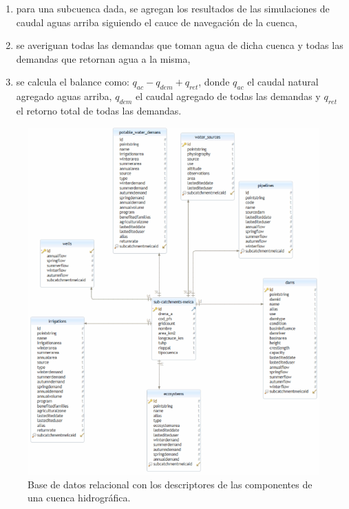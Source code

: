 \begin{itemize}
    \begin{enumerate}
        \item para una subcuenca dada, se agregan los resultados de las simulaciones de caudal aguas arriba siguiendo el cauce de 
        navegación de la cuenca,
        \item se averiguan todas las demandas que toman agua de dicha cuenca y todas las demandas que retornan agua a la misma,
        \item se calcula el balance como: $q_{ac}-q_{dem}+q_{ret}$, donde $q_{ac}$ el caudal natural agregado aguas arriba, $q_{dem}$ el caudal 
        agregado de todas las demandas y $q_{ret}$ el retorno total de todas las demandas.
    \end{enumerate}  
\end{itemize}


\begin{figure}[h!]
    \begin{center}
      \includegraphics[height=7.in]{Figures/BD_diagram.png}
      \caption{ Base de datos relacional con los descriptores de las componentes de una cuenca hidrográfica. }
      \label{BD}
    \end{center}
  \end{figure}

